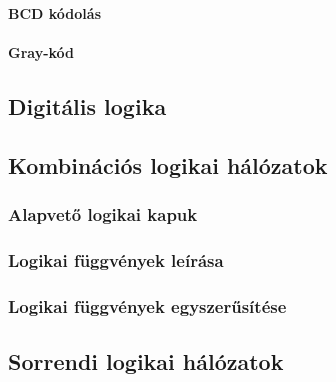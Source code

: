 \paragraph{BCD kódolás}
\paragraph{Gray-kód}
\subsection{Digitális logika}
\subsection{Kombinációs logikai hálózatok}



\subsubsection{Alapvető logikai kapuk}
\subsubsection{Logikai függvények leírása}
\subsubsection{Logikai függvények egyszerűsítése}
\subsection{Sorrendi logikai hálózatok}







\vspace{-1.5mm}
\newpage